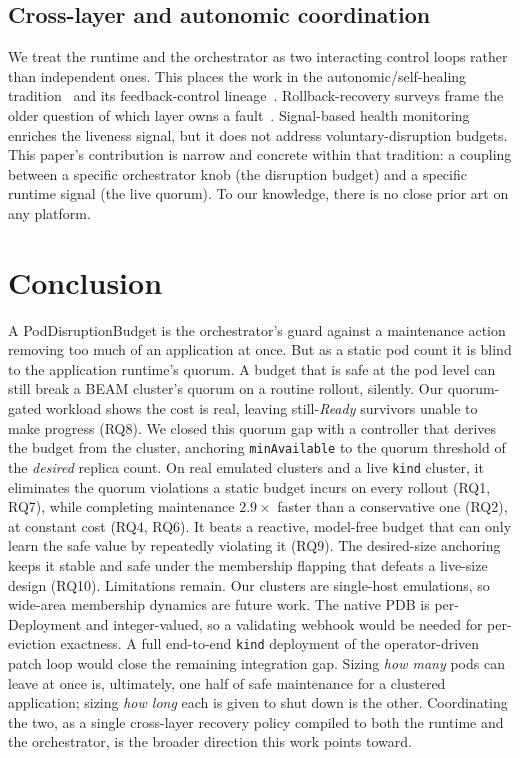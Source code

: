 \documentclass[AMA,Times1COL]{WileyNJDv5}
\begin{document}
\subsection{Cross-layer and autonomic coordination}
We treat the runtime and the orchestrator as two interacting control loops rather than independent ones.
This places the work in the autonomic/self-healing tradition~\cite{kephart2003} and its feedback-control
lineage~\cite{hellerstein2004feedback,chen2002qos,senjab2023k8s}. Rollback-recovery surveys frame the
older question of which layer owns a fault~\cite{elnozahy2002}. Signal-based health
monitoring~\cite{roberts2025} enriches the liveness signal, but it does not address voluntary-disruption
budgets. This paper's contribution is narrow and concrete within that tradition: a coupling between a
specific orchestrator knob (the disruption budget) and a specific runtime signal (the live quorum). To
our knowledge, there is no close prior art on any platform.

\section{Conclusion}\label{sec:conc}
A PodDisruptionBudget is the orchestrator's guard against a maintenance action removing too much of an
application at once. But as a static pod count it is blind to the application runtime's quorum. A budget
that is safe at the pod level can still break a BEAM cluster's quorum on a routine rollout, silently. Our
quorum-gated workload shows the cost is real, leaving still-\emph{Ready} survivors unable to make
progress (RQ8). We closed this quorum gap with a controller that derives the budget from the cluster,
anchoring \texttt{minAvailable} to the quorum threshold of the \emph{desired} replica count. On real
emulated clusters and a live \texttt{kind} cluster, it eliminates the quorum violations a static budget
incurs on every rollout (RQ1, RQ7), while completing maintenance $2.9\times$ faster than a conservative
one (RQ2), at constant cost (RQ4, RQ6). It beats a reactive, model-free budget that can only learn the
safe value by repeatedly violating it (RQ9). The desired-size anchoring keeps it stable and safe under
the membership flapping that defeats a live-size design (RQ10). Limitations remain. Our clusters are
single-host emulations, so wide-area membership dynamics are future work. The native PDB is
per-Deployment and integer-valued, so a validating webhook would be needed for per-eviction exactness.
A full end-to-end \texttt{kind} deployment of the operator-driven patch loop would close the remaining
integration gap. Sizing \emph{how many} pods can leave at once is, ultimately, one half of safe
maintenance for a clustered application; sizing \emph{how long} each is given to shut down is the other.
Coordinating the two, as a single cross-layer recovery policy compiled to both the runtime and the
orchestrator, is the broader direction this work points toward.
\end{document}
